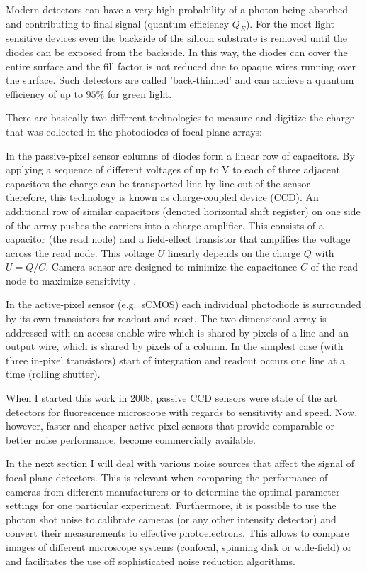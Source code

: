 Modern detectors can have a very high probability of a photon being
 absorbed and contributing to final signal
(quantum efficiency $Q_E$). For the most light sensitive devices even
the backside of the silicon substrate is removed until the diodes can
be exposed from the backside. In this way, the diodes can cover the
entire surface and the fill factor is not reduced due to opaque wires
running over the surface. Such detectors are called 'back-thinned' and
can achieve a quantum efficiency of up to $95\%$ for green light.

There are basically two different technologies to measure and digitize
the charge that was collected in the photodiodes of focal plane arrays:

In the passive-pixel sensor columns of diodes form a linear row of
 capacitors. By applying a sequence
of different voltages of up to \unit[6]{V} to each of three adjacent
capacitors the charge can be transported line by line out of the
sensor --- therefore, this technology is known as charge-coupled
device (CCD). An additional row of similar capacitors (denoted
horizontal shift register) on one side of the array pushes the
carriers into a charge amplifier.  This consists
of a capacitor (the read node) and a field-effect transistor that
amplifies the voltage across the read node. This voltage $U$ linearly
depends on the charge $Q$ with $U=Q/C$. Camera sensor are designed to
minimize the capacitance $C$ of the read node to maximize sensitivity
\citep{Pawley2006}. 

In the active-pixel sensor (e.g.\ sCMOS) each individual photodiode is surrounded by
its own  transistors for readout and
reset. The two-dimensional array is addressed with an access
enable wire which is shared by pixels of a line and an output wire,
which is shared by pixels of a column. In the simplest case (with
three in-pixel transistors) start of integration and readout occurs
one line at a time (rolling shutter).

When I started this work in 2008, passive CCD sensors were state of
the art detectors for fluorescence microscope with regards to
sensitivity and speed. Now, however, faster and cheaper active-pixel
sensors that provide comparable or better noise performance, become
commercially available.

In the next section I will deal with various noise sources that affect
the signal of focal plane detectors. This is relevant when comparing
the performance of cameras from different manufacturers or to
determine the optimal parameter settings for one particular
experiment. Furthermore, it is possible to use the photon shot noise
to calibrate cameras (or any other intensity detector) and convert
their measurements to effective photoelectrons.  This allows to compare
images of different microscope systems (confocal, spinning disk or
wide-field) or and facilitates the use off sophisticated noise
reduction algorithms.

